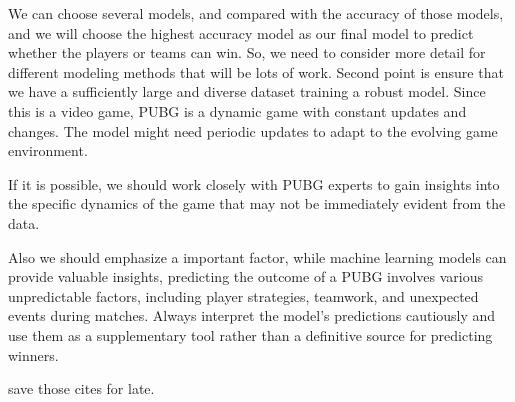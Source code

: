 \documentclass[12pt]{article}
\begin{document}
We can choose several models, and compared with the accuracy of those models, and we will choose the highest accuracy model as our final model to predict whether the players or teams can win. So, we need to consider more detail for different modeling methods that will be lots of work.
Second point is ensure that we have a sufficiently large and diverse dataset training a robust model.
Since this is a video game, PUBG is a dynamic game with constant updates and changes. The model might need periodic updates to adapt to the evolving game environment.

If it is possible, we should work closely with PUBG experts to gain insights into the specific dynamics of the game that may not be immediately evident from the data.

Also we should emphasize a important factor, while machine learning models can provide valuable insights, predicting the outcome of a PUBG  involves various unpredictable factors, including player strategies, teamwork, and unexpected events during matches. Always interpret the model's predictions cautiously and use them as a supplementary tool rather than a definitive source for predicting winners.


\citet{aggarwal2021rank}
\citet{liu2020two}
\citet{ghazali2021esports}

save those cites for late.




\end{document}
